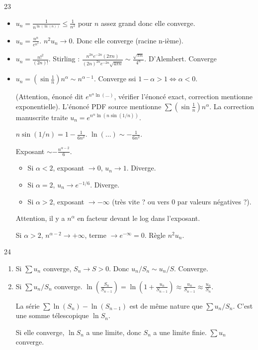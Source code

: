 \begin{correction}{23}
\begin{itemize}
    \item $u_n = \frac 1 {n^{\ln(\ln(n))}} \leqslant \frac 1 {n^2}$ pour $n$ assez grand donc elle converge. 
    \item $u_n = \frac{n^n}{e^{n^2}}$. $n^2 u_n \to 0$. Donc elle converge (racine n-ième).
    \item $u_n = \frac{n!^2}{(2n)!}$. Stirling : $\frac{n^{2n} e^{-2n} (2\pi n)}{(2n)^{2n} e^{-2n} \sqrt{4\pi n}} \sim \frac{\sqrt{\pi n}}{4^n}$. D'Alembert. Converge

    \item $u_n = (\sin \frac{1}{n}) n^\alpha \sim n^{\alpha-1}$. Converge ssi $1-\alpha > 1 \iff \alpha < 0$. 
    
        (Attention, énoncé dit $e^{n^\alpha \ln(...)}$, vérifier l'énoncé exact, correction mentionne exponentielle).
        L'énoncé PDF source mentionne $\sum (\sin \frac{1}{n}) n^\alpha$.
        La correction manuscrite traite $u_n = e^{n^\alpha \ln(n \sin(1/n))}$.

        $n \sin(1/n) = 1 - \frac{1}{6n^2}$.
        $\ln(\dots) \sim -\frac{1}{6n^2}$.

        Exposant $\sim - \frac{n^{\alpha-2}}{6}$.
        \begin{itemize}
            \item Si $\alpha < 2$, exposant $\to 0$, $u_n \to 1$. Diverge.
            \item Si $\alpha = 2$, $u_n \to e^{-1/6}$. Diverge.
            \item Si $\alpha > 2$, exposant $\to -\infty$ (très vite ? ou vers 0 par valeurs négatives ?).
        \end{itemize}
        Attention, il y a $n^\alpha$ en facteur devant le log dans l'exposant.

        Si $\alpha > 2$, $n^{\alpha-2} \to +\infty$, terme $\to e^{-\infty} = 0$.
        Règle $n^2 u_n$.
\end{itemize}
\end{correction}

\begin{correction}{24}
\begin{enumerate}
    \item Si $\sum u_n$ converge, $S_n \to S > 0$. Donc $u_n/S_n \sim u_n/S$. Converge.
    \item Si $\sum u_n/S_n$ converge.
        $\ln(\frac{S_n}{S_{n-1}}) = \ln(1 + \frac{u_n}{S_{n-1}}) \approx \frac{u_n}{S_{n-1}} \approx \frac{u_n}{S_n}$.

        La série $\sum \ln(S_n) - \ln(S_{n-1})$ est de même nature que $\sum u_n/S_n$.
        C'est une somme télescopique $\ln S_n$.

        Si elle converge, $\ln S_n$ a une limite, donc $S_n$ a une limite finie. $\sum u_n$ converge.
\end{enumerate}
\end{correction}

